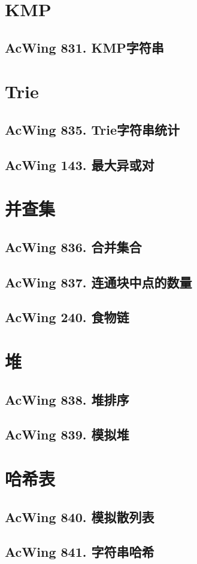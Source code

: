 \section{KMP}
\subsection{AcWing 831. KMP字符串}

\section{Trie}
\subsection{AcWing 835. Trie字符串统计}
\subsection{AcWing 143. 最大异或对}

\section{并查集}
\subsection{AcWing 836. 合并集合}
\subsection{AcWing 837. 连通块中点的数量}
\subsection{AcWing 240. 食物链}

\section{堆}
\subsection{AcWing 838. 堆排序}
\subsection{AcWing 839. 模拟堆}

\section{哈希表}
\subsection{AcWing 840. 模拟散列表}
\subsection{AcWing 841. 字符串哈希}